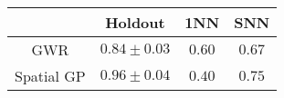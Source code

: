 \begin{tabular}{c|ccc} 
    & Holdout & 1NN & SNN \\ \hline 
GWR & $\mathbf{0.84 \pm 0.03}$ & $0.60$ & $\mathbf{0.67}$ \\ 
Spatial GP & $0.96 \pm 0.04$ & $\mathbf{0.40}$ & $0.75$ \\ 
\end{tabular}